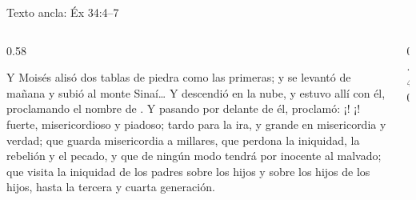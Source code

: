 \begin{frame}{Texto ancla: Éx 34:4--7}
\begin{columns}[c,onlytextwidth]
\begin{column}{0.58\textwidth}
\begin{cita}Y Moisés alisó dos tablas de piedra como las primeras; y se levantó de mañana y subió al monte Sinaí\ldots{} Y \SENOR{} descendió en la nube, y estuvo allí con él, proclamando el nombre de \SENOR. Y pasando \SENOR{} por delante de él, proclamó: ¡\SENOR! ¡\SENOR! fuerte, misericordioso y piadoso; tardo para la ira, y grande en misericordia y verdad; que guarda misericordia a millares, que perdona la iniquidad, la rebelión y el pecado, y que de ningún modo tendrá por inocente al malvado; que visita la iniquidad de los padres sobre los hijos y sobre los hijos de los hijos, hasta la tercera y cuarta generación.\end{cita}
\end{column}
\begin{column}{0.40\textwidth}\end{column}
\end{columns}
\end{frame}

